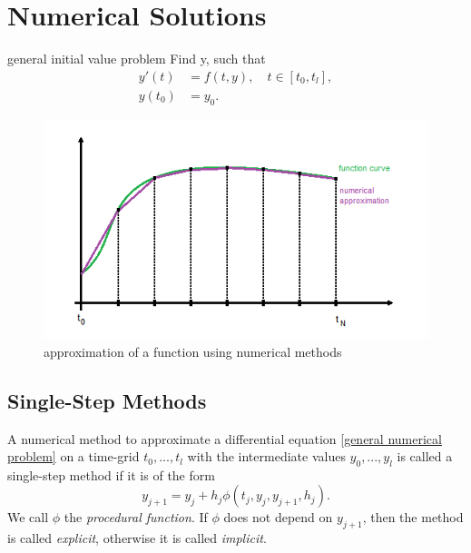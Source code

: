 \section*{Numerical Solutions}
	\begin{frame}
		general initial value problem
		Find y, such that
		\begin{align}
			\label{general numerical problem}
			y'(t) &= f(t,y), \quad t \in [t_0, t_l], \\
			y(t_0) &= y_0.
		\end{align}
		
		\begin{figure}[H]
			\centering
			\includegraphics[scale=0.7]{../Tex/pictures/num_approx.png}
			\caption{approximation of a function using numerical methods}
			\label{fig:numerical approximation}
		\end{figure}
		
	\end{frame}
	\subsection{Single-Step Methods}
	\begin{frame}
		\begin{definition}
			\label{def:single step mehod}
			A numerical method to approximate a differential equation \ref{general numerical problem} on a time-grid $t_0,...,t_l$ with the intermediate values $y_0,...,y_l$ is called a single-step method if it is of the form
			\begin{equation}
				\label{single-step method}
				y_{j+1} = y_j + h_j \phi(t_j,y_j, y_{j+1},h_j).
			\end{equation}
			We call $\phi$ the \emph{procedural function}. If $\phi$ does not depend on $y_{j+1}$, then the method is called \emph{explicit}, otherwise it is called \emph{implicit}.
		\end{definition}
	\end{frame}
	
